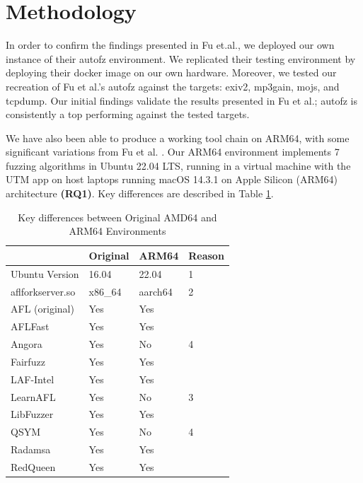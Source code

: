 \section{Methodology}
In order to confirm the findings presented in Fu et.al.\cite{fu_autofz_2023}, we deployed our 
own instance of their autofz environment. We replicated their testing environment 
by deploying their docker image on our own hardware. Moreover, we tested our 
recreation of Fu et al.'s autofz against the targets: exiv2, mp3gain, mojs, and 
tcpdump. Our initial findings validate the results presented in Fu et al.; autofz 
is consistently a top performing  against the tested targets.

We have also been able to produce a working tool chain on ARM64, with some significant 
variations from Fu et al. \cite{fu_autofz_2023}. Our ARM64 environment implements 7 fuzzing 
algorithms in Ubuntu 22.04 LTS, running in a virtual machine with the UTM app on 
host laptops running macOS 14.3.1 on Apple Silicon (ARM64) architecture 
\textbf{(RQ1)}. Key differences are described in Table \ref{arm64-characteristics}.

\begin{table}[ht]
    \begin{tabular}{|l|l|l|l|}
        \hline
                        & Original\cite{fu_autofz_2023} & ARM64 & Reason \\
        \hline
        Ubuntu Version  & 16.04             & 22.04 & 1 \\
        \hline
        aflforkserver.so    & x86\_64           & aarch64 & 2 \\
        \hline
        AFL (original)  & Yes               & Yes & \\
        \hline
        AFLFast         & Yes               & Yes & \\
        \hline
        Angora          & Yes               & No & 4 \\
        \hline
        Fairfuzz        & Yes               & Yes & \\
        \hline
        LAF-Intel       & Yes               & Yes & \\
        \hline
        LearnAFL        & Yes               & No & 3 \\
        \hline
        LibFuzzer       & Yes               & Yes & \\
        \hline
        QSYM            & Yes               & No & 4 \\
        \hline
        Radamsa         & Yes               & Yes & \\
        \hline
        RedQueen        & Yes               & Yes & \\
        \hline
    \end{tabular}
    \caption{Key differences between Original AMD64 and ARM64 Environments}
    \label{arm64-characteristics}
\end{table}

